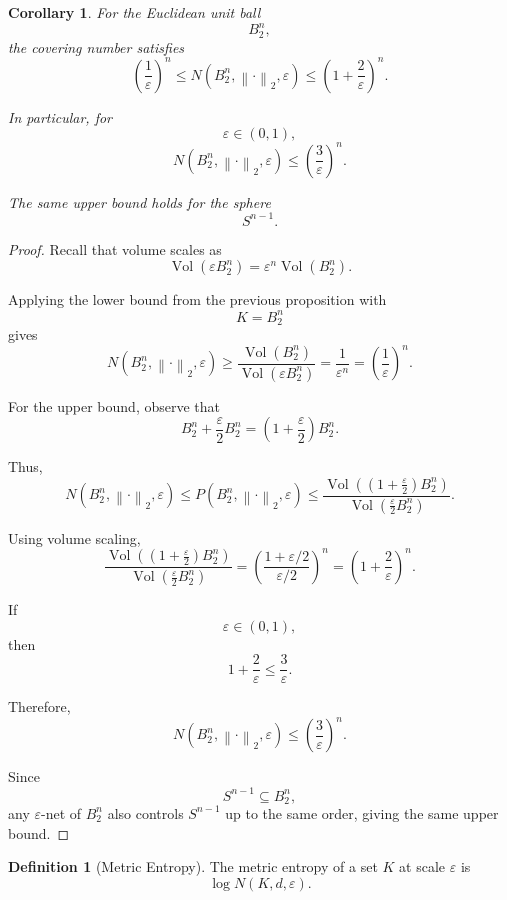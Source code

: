 \documentclass[12pt,oneside]{book}
\numberwithin{equation}{section}
\theoremstyle{definition}
\newtheorem{definition}{Definition}[section]
\theoremstyle{plain}
\newtheorem{corollary}{Corollary}[section]
\theoremstyle{remark}
\newcommand{\norm}[1]{\left\lVert #1 \right\rVert}
\begin{document}
\begin{corollary}
For the Euclidean unit ball
\[
B_2^n,
\]
the covering number satisfies
\[
\left(\frac{1}{\varepsilon}\right)^n
\leq
N(B_2^n,\norm{\cdot}_2,\varepsilon)
\leq
\left(1+\frac{2}{\varepsilon}\right)^n.
\]

In particular, for
\[
\varepsilon\in(0,1),
\]
\[
N(B_2^n,\norm{\cdot}_2,\varepsilon)
\leq
\left(\frac{3}{\varepsilon}\right)^n.
\]

The same upper bound holds for the sphere
\[
S^{n-1}.
\]
\end{corollary}

\begin{proof}
Recall that volume scales as
\[
\operatorname{Vol}(\varepsilon B_2^n)
=
\varepsilon^n\operatorname{Vol}(B_2^n).
\]

Applying the lower bound from the previous proposition with
\[
K=B_2^n
\]
gives
\[
N(B_2^n,\norm{\cdot}_2,\varepsilon)
\geq
\frac{\operatorname{Vol}(B_2^n)}
{\operatorname{Vol}(\varepsilon B_2^n)}
=
\frac{1}{\varepsilon^n}
=
\left(\frac{1}{\varepsilon}\right)^n.
\]

For the upper bound, observe that
\[
B_2^n+\frac{\varepsilon}{2}B_2^n
=
\left(1+\frac{\varepsilon}{2}\right)B_2^n.
\]

Thus,
\[
N(B_2^n,\norm{\cdot}_2,\varepsilon)
\leq
P(B_2^n,\norm{\cdot}_2,\varepsilon)
\leq
\frac{
\operatorname{Vol}\left(
\left(1+\frac{\varepsilon}{2}\right)B_2^n
\right)
}{
\operatorname{Vol}\left(
\frac{\varepsilon}{2}B_2^n
\right)
}.
\]

Using volume scaling,
\[
\frac{
\operatorname{Vol}\left(
\left(1+\frac{\varepsilon}{2}\right)B_2^n
\right)
}{
\operatorname{Vol}\left(
\frac{\varepsilon}{2}B_2^n
\right)
}
=
\left(
\frac{1+\varepsilon/2}{\varepsilon/2}
\right)^n
=
\left(
1+\frac{2}{\varepsilon}
\right)^n.
\]

If
\[
\varepsilon\in(0,1),
\]
then
\[
1+\frac{2}{\varepsilon}
\leq
\frac{3}{\varepsilon}.
\]

Therefore,
\[
N(B_2^n,\norm{\cdot}_2,\varepsilon)
\leq
\left(\frac{3}{\varepsilon}\right)^n.
\]

Since
\[
S^{n-1}\subseteq B_2^n,
\]
any $\varepsilon$-net of $B_2^n$ also controls $S^{n-1}$ up to the same order, giving the same upper bound.
\end{proof}

\begin{definition}[Metric Entropy]
The metric entropy of a set $K$ at scale $\varepsilon$ is
\[
\log N(K,d,\varepsilon).
\]
\end{definition}
\end{document}
